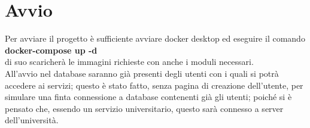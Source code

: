 \documentclass{article}
\begin{document}
\section{Avvio}
Per avviare il progetto è sufficiente avviare docker desktop ed eseguire il comando \\\textbf{docker-compose up -d} \\di suo scaricherà le immagini richieste con anche i moduli necessari.\\
All'avvio nel database saranno già presenti degli utenti con i quali si potrà accedere ai servizi; questo è stato fatto, senza pagina di creazione dell'utente, per simulare una finta connessione a database contenenti già gli utenti; poiché si è pensato che, essendo un servizio universitario, questo sarà connesso a server dell'università. 
\end{document}

